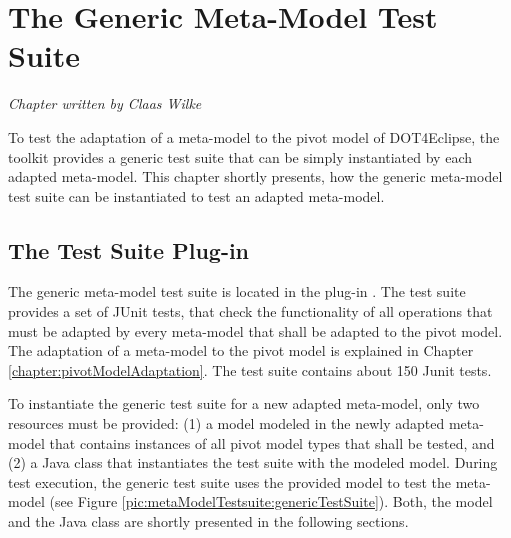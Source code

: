 \chapter{The Generic Meta-Model Test Suite}
\label{chapter:metaModelTestSuite}

\begin{flushright}
\textit{Chapter written by Claas Wilke}
\end{flushright}

To test the adaptation of a meta-model to the pivot model of \acl{DOT4Eclipse}, the toolkit provides a generic test suite that can be simply instantiated by each adapted meta-model. This chapter shortly presents, how the generic meta-model test suite can be instantiated to test an adapted meta-model.



\section{The Test Suite Plug-in}

The generic meta-model test suite is located in the plug-in . The test suite provides a set of JUnit tests, that check the functionality of all operations that must be adapted by every meta-model that shall be adapted to the pivot model. The adaptation of a meta-model to the pivot model is explained in Chapter \ref{chapter:pivotModelAdaptation}. The test suite contains about 150 Junit tests.

To instantiate the generic test suite for a new adapted meta-model, only two resources must be provided: (1) a model modeled in the newly adapted meta-model that contains instances of all pivot model types that shall be tested, and (2) a Java class that instantiates the test suite with the modeled model. During test execution, the generic test suite uses the provided model to test the meta-model (see Figure \ref{pic:metaModelTestsuite:genericTestSuite}). Both, the model and the Java class are shortly presented in the following sections.

